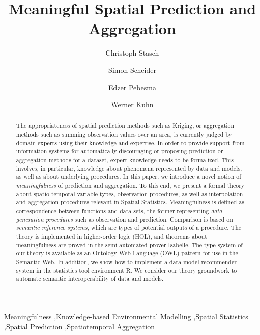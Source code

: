 \documentclass[final,authoryear,1p,times]{elsarticle}
\begin{document}
\begin{frontmatter}



\title{Meaningful Spatial Prediction and Aggregation}


\address[ifgi]{Institute for Geoinformatics, University of Muenster, Heisenbergstr. 2, 48149 Muenster, Germany}
\address[52n]{52° North Initiative for Geospatial Open Source Software GmbH, Martin-Luther-King-Weg 24, 48151 Muenster, Germany}

\author[ifgi]{Christoph Stasch}
\author[ifgi]{Simon Scheider}
\author[ifgi,52n]{Edzer Pebesma}
\author[ifgi]{Werner Kuhn}


\begin{abstract}
The appropriateness of spatial prediction methods such as Kriging, or aggregation methods such as summing observation values over an area, is currently judged by domain experts using their knowledge and expertise. In order to provide support from information systems for automatically discouraging or proposing prediction or aggregation methods for a dataset, expert knowledge needs to be formalized. This involves, in particular, knowledge about phenomena represented by data and models, as well as about underlying procedures. In this paper, we introduce a novel notion of \textit{meaningfulness} of prediction and aggregation. To this end, we present a formal theory about spatio-temporal variable types, observation procedures, as well as interpolation and aggregation procedures relevant in Spatial Statistics. Meaningfulness is defined as correspondence between functions and data sets, the former representing \textit{data generation procedures} such as observation and prediction. Comparison is based on \textit{semantic reference systems}, which are types of potential outputs of a procedure. The theory is implemented in higher-order logic (HOL), and theorems about meaningfulness are proved in the semi-automated prover Isabelle. The type system of our theory is available as an Ontology Web Language (OWL) pattern for use in the Semantic Web. In addition, we show how to implement a data-model recommender system in the statistics tool environment R. We consider our theory groundwork to automate semantic interoperability of data and models. 
\end{abstract}

\begin{keyword}
Meaningfulness \sep Knowledge-based Environmental Modelling \sep Spatial Statistics \sep Spatial Prediction \sep Spatiotemporal Aggregation
\end{keyword}

\end{frontmatter}
\end{document}
